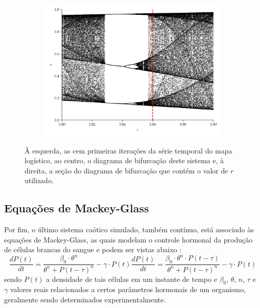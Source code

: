 \documentclass[a4paper, 12pt]{article}
\begin{document}
\begin{figure}[H]
     \begin{subfigure}[t]{0.32\textwidth} 
         \includegraphics[scale=0.32]{mapa-logistico-zoom.png}
     \end{subfigure}
     \caption{À esquerda, as cem primeiras iterações da série temporal do mapa logístico, ao centro, o diagrama de bifurcação deste sistema e, à direita, a seção do diagrama de bifurcação que contém o valor de $r$ utilizado.}
     \label{fig:logistic}
\end{figure}

\subsection{Equações de Mackey-Glass}

Por fim, o último sistema caótico simulado, também contínuo, está associado às equações de Mackey-Glass, as quais modelam o controle hormonal da produção de células brancas do sangue e podem ser vistas abaixo \cite{mackey1977oscillation}:
\begin{subequations}
\begin{equation}
\frac{dP(t)}{dt} = \frac{\beta_0\cdot \theta^n}{\theta^n + P(t - \tau)^n} - \gamma\cdot P(t)
\end{equation}
\begin{equation}\label{eq:mackey-glass-chaos}
\frac{dP(t)}{dt} = \frac{\beta_0\cdot \theta^n \cdot P(t - \tau)}{\theta^n + P(t - \tau)^n} - \gamma\cdot P(t)
\end{equation}
\end{subequations}
sendo $P(t)$ a densidade de tais células em um instante de tempo e $\beta_0$, $\theta$, $n$, $\tau$ e $\gamma$ valores reais relacionados a certos parâmetros hormonais de um organismo, geralmente sendo determinados experimentalmente.
\end{document}
